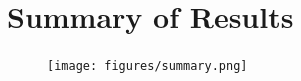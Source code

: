 \documentclass[aspectratio=169]{beamer}
\begin{document}

 
\section{Summary of Results}
\begin{frame}[noframenumbering]{}
	\vspace*{-5pt}
	\begin{figure}[htpb]
		\centering
		\texttt{[image: figures/summary.png]}
	\end{figure}
\end{frame}
\end{document}
